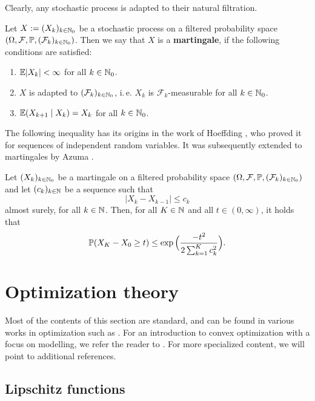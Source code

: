 Clearly, any stochastic process is adapted to their natural filtration.

\begin{definition}[Martingale]
    Let $X := (X_k)_{k\in\mathbb{N}_0}$ be a stochastic process on a
    filtered probability space
    $(\Omega, \mathcal{F}, \mathbb{P}, (\mathcal{F}_k)_{k\in\mathbb{N}_0})$.
    Then we say that $X$ is a \textbf{martingale}, if the following conditions are satisfied:
    \begin{enumerate}
        \item $\mathbb{E}|X_k| < \infty$ for all $k\in\mathbb{N}_0$.
        \item $X$ is adapted to $(\mathcal{F}_k)_{k\in\mathbb{N}_0}$, i.\,e. $X_k$ is $\mathcal{F}_k$-measurable for all $k\in\mathbb{N}_0$.
        \item $\mathbb{E}(X_{k+1} \mid X_{k}) = X_k$ for all $k\in\mathbb{N}_0$.
    \end{enumerate}
\end{definition}

The following inequality has its origins in the work of Hoeffding \cite{hoeffding1963probability},
who proved it for sequences of independent random variables.
It was subsequently extended to martingales by Azuma \cite{azuma1967weighted}.

\begin{proposition}
    \label{prop:azuma-hoeffding}
    Let $(X_k)_{k\in\mathbb{N}_0}$ be a martingale on a filtered probability space
    $(\Omega, \mathcal{F}, \mathbb{P}, (\mathcal{F}_k)_{k\in\mathbb{N}_0})$
    and let $(c_k)_{k\in\mathbb{N}}$ be a sequence such that
    \[
        |X_k - X_{k-1}| \leq c_k
    \]
    almost surely, for all $k\in\mathbb{N}$. Then, for all $K\in\mathbb{N}$
    and all $t\in (0, \infty)$, it holds that
    \[
        \mathbb{P}(X_K - X_0 \geq t) \leq \exp\Big( \frac{-t^2}{2 \sum_{k=1}^K c_k^2} \Big).
    \]
\end{proposition}

\section{Optimization theory}

Most of the contents of this section are standard, and can be found in various works in optimization such
as \cite{rockafellar1997convex,garrigos2023handbook}. For an introduction to convex optimization with a focus
on modelling,
we refer the reader to \cite{boyd2004convex}.
For more specialized content, we will
point to additional references.

\subsection{Lipschitz functions}

